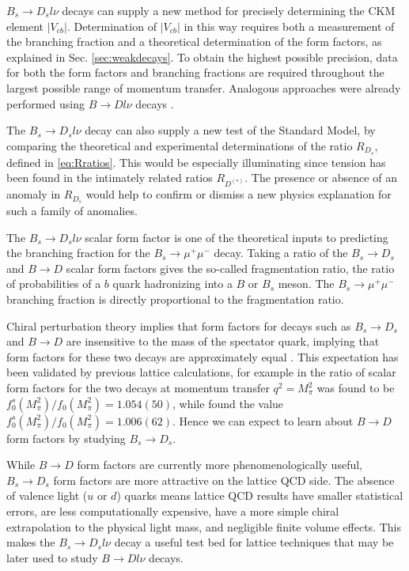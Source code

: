 $B_s\to D_s l\nu$ decays can supply a new method for precisely determining the CKM element $|V_{cb}|$. Determination of $|V_{cb}|$ in this way requires both a measurement of the branching fraction and a theoretical determination of the form factors, as explained in Sec. \ref{sec:weakdecays}. To obtain the highest possible precision, data for both the form factors and branching fractions are required throughout the largest possible range of momentum transfer. Analogous approaches were already performed using $B\to D l \nu$ decays \cite{Buskulic:1996yq,Bartelt:1998dq,Aubert:2008yv,Aubert:2009ac,Lattice:2015rga,Na:2015kha,Glattauer:2015teq}. 

The $B_s\to D_s l\nu$ decay can also supply a new test of the Standard Model, by comparing the theoretical and experimental determinations of the ratio $R_{D_s}$, defined in \eqref{eq:Rratios}. This would be especially illuminating since tension has been found in the intimately related ratios $R_{D^{(*)}}$. The presence or absence of an anomaly in $R_{D_s}$ would help to confirm or dismiss a new physics explanation for such a family of anomalies.

The $B_s\to D_s l\nu$ scalar form factor is one of the theoretical inputs to predicting the branching fraction for the $B_s \to \mu^+\mu^-$ decay. Taking a ratio of the $B_s\to D_s$ and $B\to D$ scalar form factors gives the so-called fragmentation ratio, the ratio of probabilities of a $b$ quark hadronizing into a $B$ or $B_s$ meson. The $B_s\to \mu^+\mu^-$ branching fraction is directly proportional to the fragmentation ratio.

Chiral perturbation theory implies that form factors for decays such as $B_s \to D_s$ and $B \to D$ are insensitive to the mass of the spectator quark, implying that form factors for these two decays are approximately equal \cite{Laiho:2005ue}. This expectation has been validated by previous lattice calculations, for example in \cite{PhysRevD.85.114502} the ratio of scalar form factors for the two decays at momentum transfer $q^2=M^2_{\pi}$ was found to be $f^s_0(M_{\pi}^2)/f_0(M_{\pi}^2) = 1.054(50)$, while \cite{Monahan:2017uby} found the value $f^s_0(M_{\pi}^2)/f_0(M_{\pi}^2) = 1.006(62)$. Hence we can expect to learn about $B\to D$ form factors by studying $B_s\to D_s$. 

While $B\to D$ form factors are currently more phenomenologically useful, $B_s\to D_s$ form factors are more attractive on the lattice QCD side. The absence of valence light ($u$ or $d$) quarks means lattice QCD results have smaller statistical errors, are less computationally expensive, have a more simple chiral extrapolation to the physical light mass, and negligible finite volume effects. This makes the $B_s \to D_s l\nu$ decay a useful test bed for lattice techniques that may be later used to study $B \to D l \nu$ decays.


